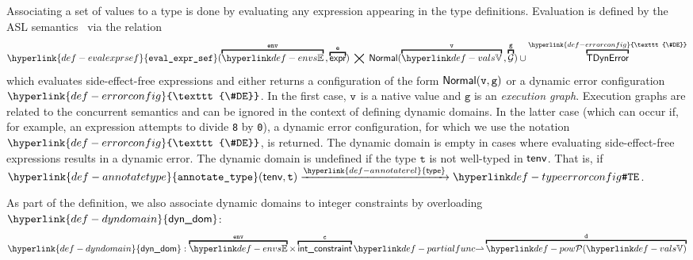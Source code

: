 \documentclass{book}
\newcommand\Normal[0]{\textsf{Normal}}
\newcommand\vg[0]{\texttt{g}}
\newcommand\env[0]{\texttt{env}}
\newcommand\evalexprsef[1]{\hyperlink{def-evalexprsef}{\texttt{eval\_expr\_sef}}(#1)}
\newcommand\XGraphs[0]{\mathcal{G}}
\newcommand\TError[0]{\textsf{TDynError}}
\newcommand\ErrorConfig[0]{\hyperlink{def-errorconfig}{\texttt{\#DE}}}
\newcommand\dynamicdomain[0]{\hyperlink{def-dyndomain}{\textsf{dyn\_dom}}}
\newcommand\annotaterel[0]{\hyperlink{def-annotaterel}{\textsf{type}}}
\newcommand\typearrow[0]{\xrightarrow{\annotaterel}}
\newcommand\annotatetype[1]{\hyperlink{def-annotatetype}{\texttt{annotate\_type}}(#1)}
\newcommand\vc[0]{\texttt{c}}
\newcommand\vt[0]{\texttt{t}}
\begin{document}
Associating a set of values to a type is done by evaluating any expression appearing
in the type definitions. Evaluation is defined by the ASL semantics~\cite{ASLSemanticsReference}
via the relation
\hypertarget{def-evalexprsef}{}
\[
  \evalexprsef{\overname{\envs}{\env} \aslsep \overname{\expr}{\ve}} \;\aslrel\;
  \Normal(\overname{\vals}{\vv}\aslsep\overname{\XGraphs}{\vg}) \cup
  \overname{\TError}{\ErrorConfig}
\]
\hypertarget{def-errorconfig}{}
which evaluates side-effect-free expressions and either returns
a configuration of the form $\Normal(\vv,\vg)$ or a dynamic error configuration $\ErrorConfig$.
In the first case, $\texttt{v}$ is a native value and $\vg$
is an \emph{execution graph}. Execution graphs are related to the concurrent semantics
and can be ignored in the context of defining dynamic domains.
In the latter case (which can occur if, for example, an expression attempts to divide
\texttt{8} by \texttt{0}), a dynamic error configuration, for which we use the notation
$\ErrorConfig$, is returned.
%
The dynamic domain is empty in cases where evaluating side-effect-free expressions
results in a dynamic error.
%
The dynamic domain is undefined if the type $\vt$ is not well-typed in $\textsf{tenv}$.
That is, if $\annotatetype{\tenv, \vt} \typearrow \TypeErrorConfig$.

As part of the definition, we also associate dynamic domains to integer constraints
by overloading $\dynamicdomain$:
\[
  \dynamicdomain : \overname{\envs}{\env} \times \overname{\intconstraint}{\vc}
  \partialto \overname{\pow{\vals}}{\vd}
\]
\end{document}
